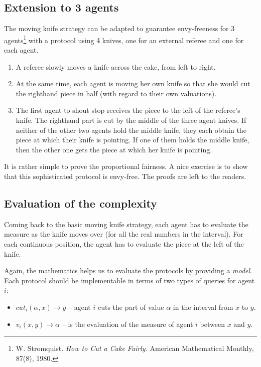 \subsection{Extension to 3 agents}

The moving knife strategy can be adapted to guarantee envy-freeness for 3 agents\footnote{W. Stromquist.
\textit{How to Cut a Cake Fairly.} American Mathematical Monthly, 87(8), 1980.}
with a protocol using $4$ knives, one for an external referee and one for each agent.

\begin{enumerate}
\item
A referee slowly moves a knife across the cake, from left to right.
\item
At the same time, each agent is moving her own knife so that she would cut the righthand piece in half 
(with regard to their own valuations).
\item
The first agent to shout stop receives the piece to the left of the referee’s knife. 
The righthand part is cut by the middle of the three agent knives. 
If neither of the other two agents hold the middle knife, they each obtain the piece at which their knife is pointing. 
If one of them holds the middle knife, then the other one gets the piece at which her knife is pointing.
\end{enumerate}
\bigskip

It is rather simple to prove the proportional fairness.
A nice exercise is to show that this sophisticated protocol is envy-free. The proofs are left to the readers. 


\subsection{Evaluation of the complexity}

Coming back to the basic moving knife strategy, each agent has to evaluate the measure as the knife moves over (for all the real numbers in the interval). 
For each continuous position, the agent has to evaluate the piece at the left of the knife.

Again, the mathematics helps us to evaluate the protocols by providing a \textit{model}.
Each protocol should be implementable in terms of two types of queries for agent $i$:
 \begin{itemize}
 \item $cut_i(\alpha,x) \rightarrow y$ -- agent $i$ cuts the part of value $\alpha$ in the interval from $x$ to $y$. 
 \item $v_i(x,y) \rightarrow \alpha$ -- is the evaluation of the measure of agent $i$  between $x$ and $y$.
 \end{itemize}
 
